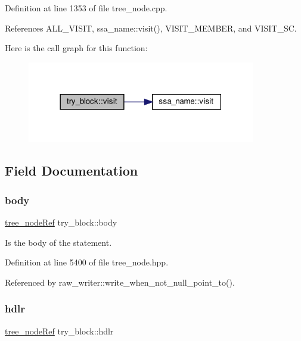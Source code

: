 Definition at line 1353 of file tree\+\_\+node.\+cpp.



References A\+L\+L\+\_\+\+V\+I\+S\+IT, ssa\+\_\+name\+::visit(), V\+I\+S\+I\+T\+\_\+\+M\+E\+M\+B\+ER, and V\+I\+S\+I\+T\+\_\+\+SC.

Here is the call graph for this function\+:
\nopagebreak
\begin{figure}[H]
\begin{center}
\leavevmode
\includegraphics[width=282pt]{df/d7b/structtry__block_aedc2ad7c024dea066c6d6d18f13dd736_cgraph}
\end{center}
\end{figure}


\subsection{Field Documentation}
\mbox{\label{structtry__block_a46c2521e8914c63ac3f8a3d032a8502c}} 
\subsubsection{\texorpdfstring{body}{body}}
{\footnotesize\ttfamily \hyperlink{tree__node_8hpp_a6ee377554d1c4871ad66a337eaa67fd5}{tree\+\_\+node\+Ref} try\+\_\+block\+::body}



Is the body of the statement. 



Definition at line 5400 of file tree\+\_\+node.\+hpp.



Referenced by raw\+\_\+writer\+::write\+\_\+when\+\_\+not\+\_\+null\+\_\+point\+\_\+to().

\mbox{\label{structtry__block_a5c5b3ccaa1d2707f50daf00a33f693a6}} 
\subsubsection{\texorpdfstring{hdlr}{hdlr}}
{\footnotesize\ttfamily \hyperlink{tree__node_8hpp_a6ee377554d1c4871ad66a337eaa67fd5}{tree\+\_\+node\+Ref} try\+\_\+block\+::hdlr}



